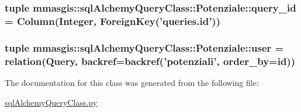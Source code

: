 \label{classmmasgis_1_1sqlAlchemyQueryClass_1_1Potenziale_a72a6af708fc6051c09dddea0904d99d4}
\hypertarget{classmmasgis_1_1sqlAlchemyQueryClass_1_1Potenziale_a8c0ca5d07c20cec3a56d93957ba7e916}{
\subsubsection[{query\_\-id}]{\setlength{\rightskip}{0pt plus 5cm}tuple {\bf mmasgis::sqlAlchemyQueryClass::Potenziale::query\_\-id} = Column(Integer, ForeignKey('queries.id'))}}
\label{classmmasgis_1_1sqlAlchemyQueryClass_1_1Potenziale_a8c0ca5d07c20cec3a56d93957ba7e916}
\hypertarget{classmmasgis_1_1sqlAlchemyQueryClass_1_1Potenziale_a2761c76b2569922e0449a35cce40f1b7}{
\subsubsection[{user}]{\setlength{\rightskip}{0pt plus 5cm}tuple {\bf mmasgis::sqlAlchemyQueryClass::Potenziale::user} = relation({\bf Query}, backref=backref('potenziali', order\_\-by={\bf id}))}}
\label{classmmasgis_1_1sqlAlchemyQueryClass_1_1Potenziale_a2761c76b2569922e0449a35cce40f1b7}


The documentation for this class was generated from the following file:\begin{DoxyCompactItemize}
\item 
\hyperlink{sqlAlchemyQueryClass_8py}{sqlAlchemyQueryClass.py}\end{DoxyCompactItemize}
